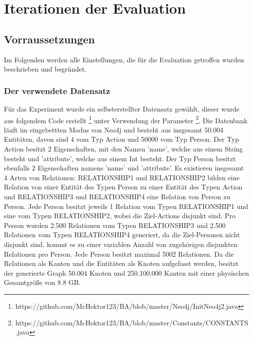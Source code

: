 
\chapter{Iterationen der Evaluation} %

\label{Kaptiel3} %

\section{Vorraussetzungen}
Im Folgenden werden alle Einstellungen, die für die Evaluation getroffen wurden beschrieben und begründet. 
\subsection{Der verwendete Datensatz}
Für das Experiment wurde ein selbsterstellter Datensatz gewählt, dieser wurde aus folgendem Code erstellt \footnote{https://github.com/McHektor123/BA/blob/master/Neo4j/InitNeo4j2.java} unter Verwendung der Parameter \footnote{https://github.com/McHektor123/BA/blob/master/Constants/CONSTANTS.java}. Die Datenbank läuft im eingebettten Modus von Neo4j und besteht aus insgesamt 50.004 Entitäten, davon sind 4  vom Typ Action und  50000  vom Typ Person. Der Typ Action besitzt  2 Eigenschaften, mit den Namen 'name', welche aus einem String besteht  und 'attribute', welche aus einem Int besteht. Der Typ Person besitzt ebenfalls 2 Eigenschaften namens 'name' und 'attribute'. \newline
Es existieren insgesamt 4 Arten von Relationen: RELATIONSHIP1 und RELATIONSHIP2 bilden eine Relation von einer Entität des Typen Person zu einer Entität des Typen Action  und  RELATIONSHIP3 und RELATIONSHIP4 eine Relation von Person zu Person. Jede Person besitzt jeweils 1 Relation vom Typen RELATIONSHIP1 und eine vom Typen RELATIONSHIP2, wobei die Ziel-Actions disjunkt sind. Pro Person wurden 2.500 Relationen vom Typen RELATIONSHIP3 und 2.500 Relationen vom Typen RELATIONSHIP4 generiert, da die Ziel-Personen nicht disjunkt sind, kommt es zu einer variablen Anzahl von zugehörigen disjunkten Relationen pro Person. Jede Person besitzt maximal 5002 Relationen. Da die Relationen als Kanten und die Entitäten als Knoten aufgefasst werden, besitzt der generierte Graph 50.004 Knoten und 250.100.000 Kanten mit einer physischen Gesamtgröße von 8.8 GB. 
